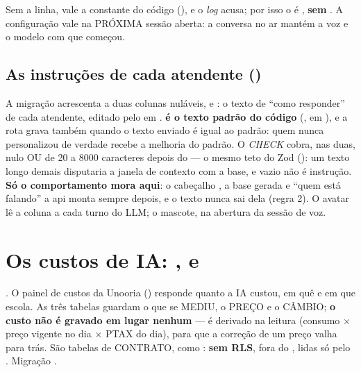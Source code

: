Sem a linha, vale a constante do código (), e o
\emph{log}  acusa; por isso o  é
, \textbf{sem }. A configuração vale na
PRÓXIMA sessão aberta: a conversa no ar mantém a voz e o modelo com que começou.

\subsection{As instruções de cada atendente ()}

A migração  acrescenta a
 duas colunas  nuláveis,
 e : o texto de
\enquote{como responder} de cada atendente, editado pelo  em
. \textbf{ é o texto padrão do código}
(, em ), e a rota grava
 também quando o texto enviado é igual ao padrão: quem nunca
personalizou de verdade recebe a melhoria do padrão. O \emph{CHECK}
 cobra, nas duas, nulo OU de 20 a
\num{8000} caracteres depois do  --- o mesmo teto do Zod
(): um texto longo demais disputaria a janela de
contexto com a base, e vazio não é instrução. \textbf{Só o comportamento mora
aqui}: o cabeçalho , a base gerada e \enquote{quem está
falando} a api monta sempre depois, e o texto nunca sai dela (regra 2). O avatar
lê a coluna a cada turno do LLM; o mascote, na abertura da sessão de voz.

\section{Os custos de IA: ,  e }
\label{sec:custos-de-ia-dados}

. O painel de custos da Unooria ()
responde quanto a IA custou, em quê e em que escola. As três tabelas guardam o
que se MEDIU, o PREÇO e o CÂMBIO; \textbf{o custo não é gravado em lugar
nenhum} --- é derivado na leitura (consumo $\times$ preço vigente no dia
$\times$ PTAX do dia), para que a correção de um preço valha para trás. São
tabelas de CONTRATO, como : \textbf{sem RLS}, fora do
, lidas só pelo . Migração
.

